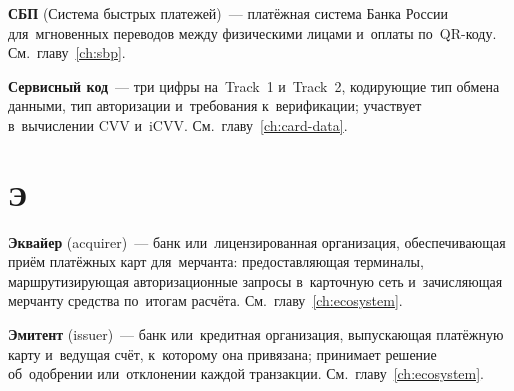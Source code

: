\textbf{СБП} (Система быстрых платежей)~--- платёжная система
Банка России для~мгновенных переводов между физическими лицами
и~оплаты по~QR-коду. См.~главу~\ref{ch:sbp}.

\textbf{Сервисный код}~--- три цифры на~Track~1 и~Track~2,
кодирующие тип обмена данными, тип авторизации и~требования
к~верификации; участвует в~вычислении CVV
и~iCVV. См.~главу~\ref{ch:card-data}.


\section*{Э}

\textbf{Эквайер} (acquirer)~--- банк или~лицензированная
организация, обеспечивающая приём платёжных карт для~мерчанта:
предоставляющая терминалы, маршрутизирующая авторизационные
запросы в~карточную сеть и~зачисляющая мерчанту средства
по~итогам расчёта. См.~главу~\ref{ch:ecosystem}.

\textbf{Эмитент} (issuer)~--- банк или~кредитная организация,
выпускающая платёжную карту и~ведущая счёт, к~которому она
привязана; принимает решение об~одобрении или~отклонении каждой
транзакции. См.~главу~\ref{ch:ecosystem}.
